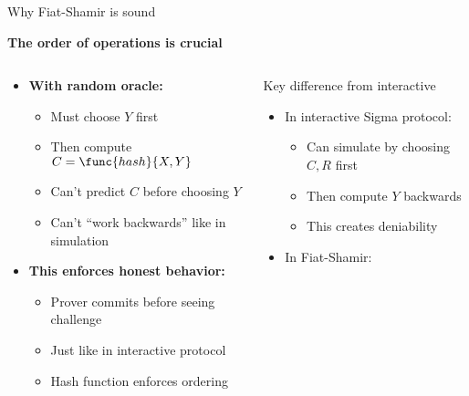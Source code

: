 \documentclass[aspectratio=169, lualatex, handout]{beamer}
\begin{document}
\begin{frame}{Why Fiat-Shamir is sound}
	\begin{center}
		\textbf{The order of operations is crucial}
	\end{center}
	\begin{columns}[c]
		\begin{column}{0.5\textwidth}
			\begin{itemize}
				\item \textbf{With random oracle:}
				      \begin{itemize}
					      \item Must choose $Y$ first
					      \item Then compute $C = \func{hash}{X, Y}$
					      \item Can't predict $C$ before choosing $Y$
					      \item Can't ``work backwards'' like in simulation
				      \end{itemize}
			\end{itemize}
			\begin{itemize}
				\item \textbf{This enforces honest behavior:}
				      \begin{itemize}
					      \item Prover commits before seeing challenge
					      \item Just like in interactive protocol
					      \item Hash function enforces ordering
				      \end{itemize}
			\end{itemize}
		\end{column}
		\begin{column}{0.5\textwidth}
			\begin{alertblock}{Key difference from interactive}
				\begin{itemize}
					\item In interactive Sigma protocol:
					      \begin{itemize}
						      \item Can simulate by choosing $C, R$ first
						      \item Then compute $Y$ backwards
						      \item This creates deniability
					      \end{itemize}
				\end{itemize}
				\begin{itemize}
					\item In Fiat-Shamir:

\end{itemize}
\end{alertblock}
\end{column}
\end{columns}
\end{frame}
\end{document}
